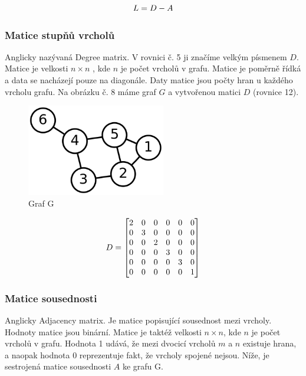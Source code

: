 \documentclass[czech, master, public, dept460, male, cpdeclaration, oneside]{diploma}
\begin{document}
\begin{equation}
\vspace*{+3.0mm}
L = D - A
\end{equation}

\subsubsection{Matice stupňů vrcholů}
Anglicky nazývaná Degree matrix. V rovnici č. 5 ji značíme velkým písmenem $D$. Matice je velkosti $n \times n$ , kde $n$ je počet vrcholů v grafu. Matice je poměrně řídká a data se nacházejí pouze na diagonále. Daty matice jsou počty hran u každého vrcholu grafu. Na obrázku č. 8 máme graf $G$ a vytvořenou matici $D$ (rovnice 12).

\begin{figure}[H]
	\vspace*{+3.0mm}
	\centering
	\includegraphics[height=4cm]{Figures/explanatory/laplacianGraph.png}
	\caption{Graf G}
\end{figure}

\begin{equation}
\vspace*{+3.0mm}
D = \begin{bmatrix} 
2 & 0 & 0 & 0 & 0 & 0 \\
0 & 3 & 0 & 0 & 0 & 0 \\
0 & 0 & 2 & 0 & 0 & 0 \\
0 & 0 & 0 & 3 & 0 & 0 \\
0 & 0 & 0 & 0 & 3 & 0 \\
0 & 0 & 0 & 0 & 0 & 1
\end{bmatrix}
\end{equation}

\subsubsection{Matice sousednosti}
Anglicky Adjacency matrix. Je matice popisující sousednost mezi vrcholy. Hodnoty matice jsou binární. Matice je taktéž velkosti $n \times n$, kde $n$ je počet vrcholů v grafu. Hodnota 1 udává, že mezi dvocicí vrcholů $m$ a $n$ existuje hrana, a naopak hodnota 0 reprezentuje fakt, že vrcholy spojené nejsou. Níže, je sestrojená matice sousednosti $A$ ke grafu G.
\end{document}
